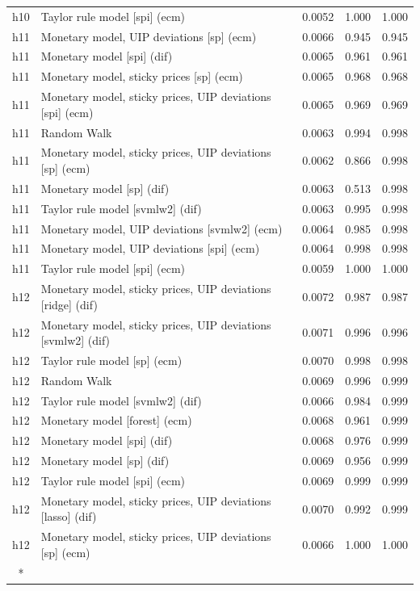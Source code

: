 \begin{ThreePartTable}
\begin{longtable}[t]{cp{5.5cm}ccc}
h10 & \raggedright Taylor rule model [spi] (ecm) & 0.0052 & 1.000 & 1.000\\
\addlinespace
h11 & \raggedright Monetary model, UIP deviations [sp] (ecm) & 0.0066 & 0.945 & 0.945\\
h11 & \raggedright Monetary model [spi] (dif) & 0.0065 & 0.961 & 0.961\\
h11 & \raggedright Monetary model, sticky prices [sp] (ecm) & 0.0065 & 0.968 & 0.968\\
h11 & \raggedright Monetary model, sticky prices, UIP deviations [spi] (ecm) & 0.0065 & 0.969 & 0.969\\
h11 & \raggedright Random Walk & 0.0063 & 0.994 & 0.998\\
h11 & \raggedright Monetary model, sticky prices, UIP deviations [sp] (ecm) & 0.0062 & 0.866 & 0.998\\
h11 & \raggedright Monetary model [sp] (dif) & 0.0063 & 0.513 & 0.998\\
h11 & \raggedright Taylor rule model [svmlw2] (dif) & 0.0063 & 0.995 & 0.998\\
h11 & \raggedright Monetary model, UIP deviations [svmlw2] (ecm) & 0.0064 & 0.985 & 0.998\\
h11 & \raggedright Monetary model, UIP deviations [spi] (ecm) & 0.0064 & 0.998 & 0.998\\
h11 & \raggedright Taylor rule model [spi] (ecm) & 0.0059 & 1.000 & 1.000\\
\addlinespace
h12 & \raggedright Monetary model, sticky prices, UIP deviations [ridge] (dif) & 0.0072 & 0.987 & 0.987\\
h12 & \raggedright Monetary model, sticky prices, UIP deviations [svmlw2] (dif) & 0.0071 & 0.996 & 0.996\\
h12 & \raggedright Taylor rule model [sp] (ecm) & 0.0070 & 0.998 & 0.998\\
h12 & \raggedright Random Walk & 0.0069 & 0.996 & 0.999\\
h12 & \raggedright Taylor rule model [svmlw2] (dif) & 0.0066 & 0.984 & 0.999\\
h12 & \raggedright Monetary model [forest] (ecm) & 0.0068 & 0.961 & 0.999\\
h12 & \raggedright Monetary model [spi] (dif) & 0.0068 & 0.976 & 0.999\\
h12 & \raggedright Monetary model [sp] (dif) & 0.0069 & 0.956 & 0.999\\
h12 & \raggedright Taylor rule model [spi] (ecm) & 0.0069 & 0.999 & 0.999\\
h12 & \raggedright Monetary model, sticky prices, UIP deviations [lasso] (dif) & 0.0070 & 0.992 & 0.999\\
h12 & \raggedright Monetary model, sticky prices, UIP deviations [sp] (ecm) & 0.0066 & 1.000 & 1.000\\*
\end{longtable}
\end{ThreePartTable}
\endgroup{}
